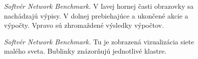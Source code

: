 \begin{figure}
	\centering
	\caption{\emph{Softvér Network Benchmark.} V ľavej hornej časti 
		obrazovky sa nachádzajú výpisy. V dolnej prebiehajúce a ukončené 
		akcie a výpočty. Vpravo sú zhromaždené výsledky výpočtov.}
	\label{img:vis:nwb1}
\end{figure}

\begin{figure}
	\centering
	\caption{\emph{Softvér Network Benchmark.} Tu je zobrazená vizualizácia 
		siete malého sveta. Bublinky znázorňujú jednotlivé klastre.}
	\label{img:vis:nwb2}
\end{figure}

